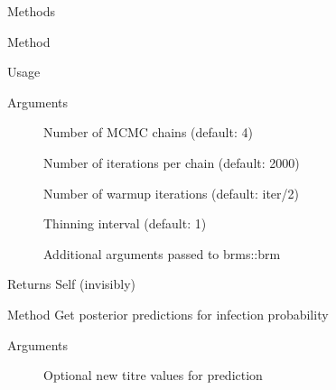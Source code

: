 \documentclass[a4paper]{book}
\begin{document}
\begin{Section}{Methods}
\begin{SubSection}{Method }
\begin{SubSubSection}{Usage}
\end{SubSubSection}


%
\begin{SubSubSection}{Arguments}

\begin{description}

\item[] Number of MCMC chains (default: 4)

\item[] Number of iterations per chain (default: 2000)

\item[] Number of warmup iterations (default: iter/2)

\item[] Thinning interval (default: 1)

\item[] Additional arguments passed to brms::brm

\end{description}


\end{SubSubSection}

%
\begin{SubSubSection}{Returns}
Self (invisibly)
\end{SubSubSection}

\end{SubSection}



\hypertarget{method-SeroCOP-predict}{}
%
\begin{SubSection}{Method }
Get posterior predictions for infection probability
%


%
\begin{SubSubSection}{Arguments}

\begin{description}

\item[] Optional new titre values for prediction

\end{description}


\end{SubSubSection}


\end{SubSection}
\end{Section}
\end{document}
